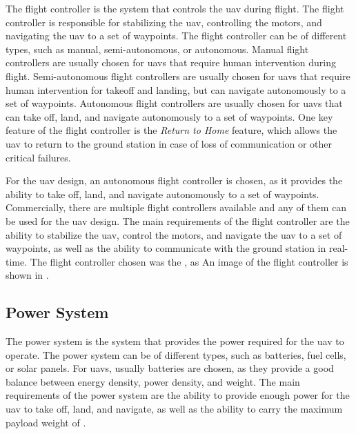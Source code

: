 The flight controller is the system that controls the \gls{uav} during flight. The flight controller is responsible for stabilizing the \gls{uav}, controlling the motors, and navigating the \gls{uav} to a set of waypoints. The flight controller can be of different types, such as manual, semi-autonomous, or autonomous. Manual flight controllers are usually chosen for \glspl{uav} that require human intervention during flight. Semi-autonomous flight controllers are usually chosen for \glspl{uav} that require human intervention for takeoff and landing, but can navigate autonomously to a set of waypoints. Autonomous flight controllers are usually chosen for \glspl{uav} that can take off, land, and navigate autonomously to a set of waypoints. One key feature of the flight controller is the \textit{Return to Home} feature, which allows the \gls{uav} to return to the ground station in case of loss of communication or other critical failures.

For the \gls{uav} design, an autonomous flight controller is chosen, as it provides the ability to take off, land, and navigate autonomously to a set of waypoints. Commercially, there are multiple flight controllers available  and any of them can be used for the \gls{uav} design. The main requirements of the flight controller are the ability to stabilize the \gls{uav}, control the motors, and navigate the \gls{uav} to a set of waypoints, as well as the ability to communicate with the ground station in real-time. The flight controller chosen was the , as  An image of the flight controller is shown in .



\subsection{Power System}\label{subsec:design_power_system}

The power system is the system that provides the power required for the \gls{uav} to operate. The power system can be of different types, such as batteries, fuel cells, or solar panels. For \glspl{uav}, usually batteries are chosen, as they provide a good balance between energy density, power density, and weight. The main requirements of the power system are the ability to provide enough power for the \gls{uav} to take off, land, and navigate, as well as the ability to carry the maximum payload weight of .

